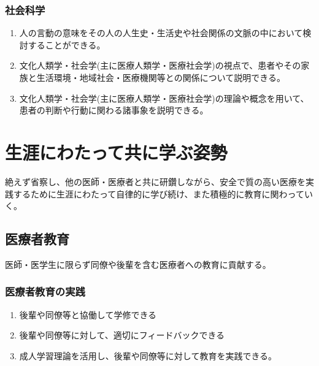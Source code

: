 \documentclass[
]{ltjsarticle}
\providecommand{\tightlist}{%
  \setlength{\itemsep}{0pt}\setlength{\parskip}{0pt}}
\begin{document}
\hypertarget{ux793eux4f1aux79d1ux5b66}{%
\subsubsection{社会科学}\label{ux793eux4f1aux79d1ux5b66}}

\begin{enumerate}
\def\labelenumi{\arabic{enumi}.}
\tightlist
\item
  人の言動の意味をその人の人生史・生活史や社会関係の文脈の中において検討することができる。
\item
  文化人類学・社会学(主に医療人類学・医療社会学)の視点で、患者やその家族と生活環境・地域社会・医療機関等との関係について説明できる。
\item
  文化人類学・社会学(主に医療人類学・医療社会学)の理論や概念を用いて、患者の判断や行動に関わる諸事象を説明できる。
\end{enumerate}

\newpage

\hypertarget{ux751fux6dafux306bux308fux305fux3063ux3066ux5171ux306bux5b66ux3076ux59ffux52e2}{%
\section{生涯にわたって共に学ぶ姿勢}\label{ux751fux6dafux306bux308fux305fux3063ux3066ux5171ux306bux5b66ux3076ux59ffux52e2}}

絶えず省察し、他の医師・医療者と共に研鑽しながら、安全で質の高い医療を実践するために生涯にわたって自律的に学び続け、また積極的に教育に関わっていく。

\hypertarget{ux533bux7642ux8005ux6559ux80b2}{%
\subsection{医療者教育}\label{ux533bux7642ux8005ux6559ux80b2}}

医師・医学生に限らず同僚や後輩を含む医療者への教育に貢献する。

\hypertarget{ux533bux7642ux8005ux6559ux80b2ux306eux5b9fux8df5}{%
\subsubsection{医療者教育の実践}\label{ux533bux7642ux8005ux6559ux80b2ux306eux5b9fux8df5}}

\begin{enumerate}
\def\labelenumi{\arabic{enumi}.}
\tightlist
\item
  後輩や同僚等と協働して学修できる
\item
  後輩や同僚等に対して、適切にフィードバックできる
\item
  成人学習理論を活用し、後輩や同僚等に対して教育を実践できる。
\end{enumerate}
\end{document}

